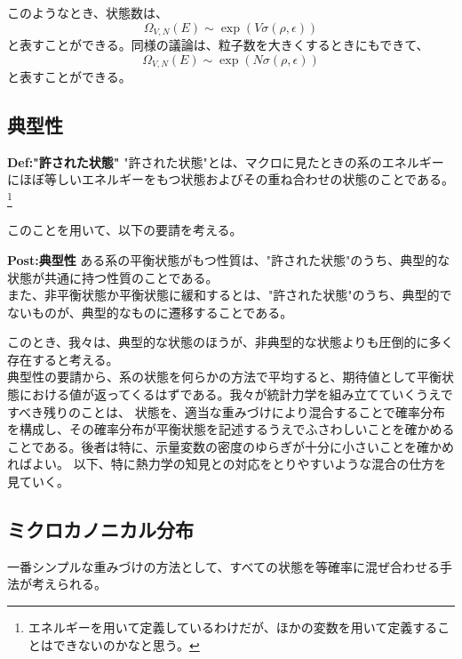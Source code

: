 \documentclass[a4paper,11pt]{jsarticle}
\numberwithin{equation}{section}
\begin{document}
このようなとき、状態数は、
\begin{equation}
  \Omega_{V,N}(E) \sim \exp(V\sigma(\rho, \epsilon))
\end{equation}
と表すことができる。同様の議論は、粒子数を大きくするときにもできて、
\begin{equation}
  \Omega_{V,N}(E) \sim \exp(N\sigma(\rho, \epsilon))
\end{equation}
と表すことができる。

\subsection{典型性}
\begin{itembox}[l]{\textbf{Def:"許された状態"}}
  "許された状態"とは、マクロに見たときの系のエネルギーにほぼ等しいエネルギーをもつ状態およびその重ね合わせの状態のことである。\footnote{エネルギーを用いて定義しているわけだが、ほかの変数を用いて定義することはできないのかなと思う。}
\end{itembox}
このことを用いて、以下の要請を考える。\\

\begin{itembox}[l]{\textbf{Post:典型性}}
  ある系の平衡状態がもつ性質は、"許された状態"のうち、典型的な状態が共通に持つ性質のことである。\\
  また、非平衡状態か平衡状態に緩和するとは、"許された状態"のうち、典型的でないものが、典型的なものに遷移することである。
\end{itembox}
このとき、我々は、典型的な状態のほうが、非典型的な状態よりも圧倒的に多く存在すると考える。\\

典型性の要請から、系の状態を何らかの方法で平均すると、期待値として平衡状態における値が返ってくるはずである。我々が統計力学を組み立てていくうえですべき残りのことは、
状態を、適当な重みづけにより混合することで確率分布を構成し、その確率分布が平衡状態を記述するうえでふさわしいことを確かめることである。後者は特に、示量変数の密度のゆらぎが十分に小さいことを確かめればよい。
以下、特に熱力学の知見との対応をとりやすいような混合の仕方を見ていく。\\

\subsection{ミクロカノニカル分布}
一番シンプルな重みづけの方法として、すべての状態を等確率に混ぜ合わせる手法が考えられる。
\end{document}
